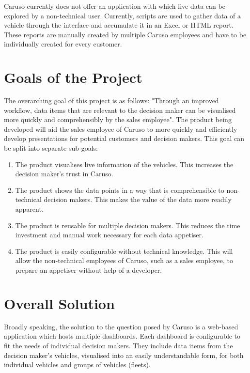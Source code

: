 Caruso currently does not offer an application with which live data can be explored by a non-technical user. Currently, scripts are used to gather data of a vehicle through the interface and accumulate it in an Excel or HTML report. These reports are manually created by multiple Caruso employees and have to be individually created for every customer.

\section{Goals of the Project}
The overarching goal of this project is as follows: "Through an improved workflow, data items that are relevant to the decision maker can be visualised more quickly and comprehensibly by the sales employee". The product being developed will aid the sales employee of Caruso to more quickly and efficiently develop presentations for potential customers and decision makers. This goal can be split into separate sub-goals: 
\begin{enumerate}
  \item The product visualises live information of the vehicles. This increases the decision maker's trust in Caruso.
  \item The product shows the data points in a way that is comprehensible to non-technical decision makers. This makes the value of the data more readily apparent.
  \item The product is reusable for multiple decision makers. This reduces the time investment and manual work necessary for each data appetiser.
  \item The product is easily configurable without technical knowledge. This will allow the non-technical employees of Caruso, such as a sales employee, to prepare an appetiser without help of a developer.
\end{enumerate}

\section{Overall Solution}
Broadly speaking, the solution to the question posed by Caruso is a web-based application which hosts multiple dashboards. Each dashboard is configurable to fit the needs of individual decision makers. They include data items from the decision maker's vehicles, visualised into an easily understandable form, for both individual vehicles and groups of vehicles (fleets).